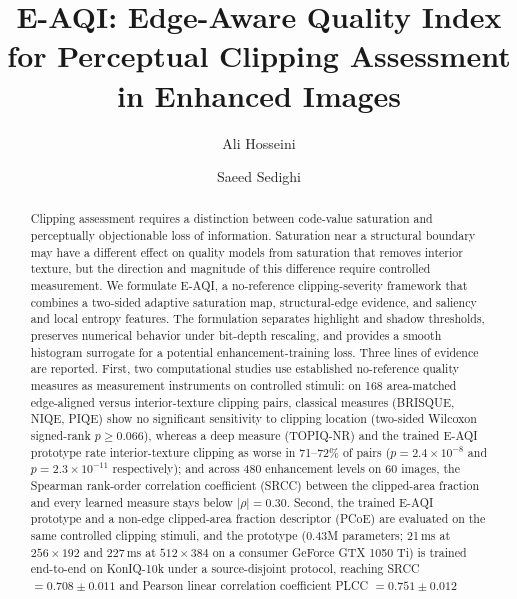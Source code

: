 \documentclass[5p,times,twocolumn]{elsarticle}
\begin{document}
\begin{frontmatter}

\title{E-AQI: Edge-Aware Quality Index for Perceptual Clipping Assessment in Enhanced Images}

\author[iau]{Ali Hosseini}
\author[iau]{Saeed Sedighi}


\begin{abstract}
Clipping assessment requires a distinction between code-value saturation and
perceptually objectionable loss of information. Saturation near a structural
boundary may have a different effect on quality models from saturation that
removes interior texture, but the direction and magnitude of this difference
require controlled measurement. We formulate E-AQI, a no-reference
clipping-severity framework that combines a two-sided adaptive saturation
map, structural-edge evidence, and saliency and local entropy features. The
formulation separates highlight and shadow thresholds, preserves numerical
behavior under bit-depth rescaling, and provides a smooth histogram surrogate
for a potential enhancement-training loss. Three lines of evidence are
reported. First, two computational studies use established no-reference
quality measures as measurement instruments on controlled stimuli: on 168
area-matched edge-aligned versus interior-texture clipping pairs, classical
measures (BRISQUE, NIQE, PIQE) show no significant sensitivity to clipping
location (two-sided Wilcoxon signed-rank $p \ge 0.066$), whereas a deep
measure (TOPIQ-NR) and the trained E-AQI prototype rate interior-texture
clipping as worse in 71--72\% of pairs ($p = 2.4 \times 10^{-8}$ and
$p = 2.3 \times 10^{-11}$ respectively); and across 480 enhancement levels on
60 images, the Spearman rank-order correlation coefficient (SRCC) between the
clipped-area fraction and every learned measure stays below $|\rho| = 0.30$.
Second, the trained E-AQI prototype and a non-edge clipped-area fraction
descriptor (PCoE) are evaluated on the same controlled clipping stimuli, and
the prototype (0.43M parameters; 21\,ms at $256 \times 192$ and 227\,ms at
$512 \times 384$ on a consumer GeForce GTX 1050 Ti) is trained end-to-end on
KonIQ-10k under a source-disjoint protocol, reaching SRCC $= 0.708 \pm
0.011$ and Pearson linear correlation coefficient PLCC $= 0.751 \pm 0.012$

\end{abstract}
\end{frontmatter}
\end{document}

